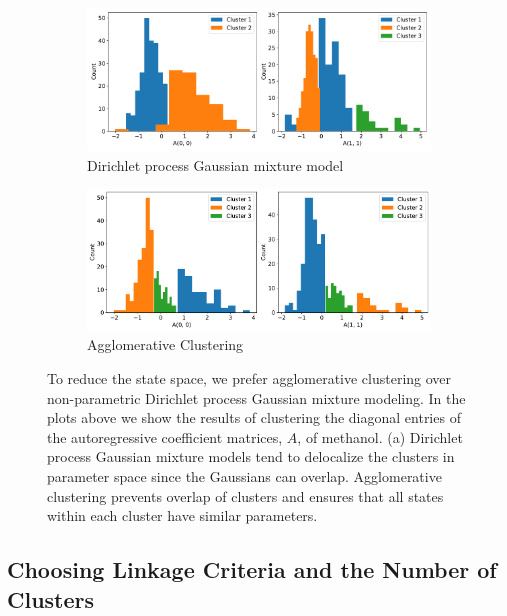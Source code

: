 \documentclass{article}
\begin{document}
  \begin{figure}[h]
  \centering
  \begin{subfigure}{0.95\textwidth}
  \includegraphics[width=\textwidth]{bayesian_A.pdf}
  \caption{Dirichlet process Gaussian mixture model}\label{fig:bayesian_A}
  \end{subfigure}
  \begin{subfigure}{0.95\textwidth}
  \includegraphics[width=\textwidth]{agglomerative_A.pdf}
  \caption{Agglomerative Clustering}\label{fig:agglomerative_A}
  \end{subfigure}
  \caption{To reduce the state space, we prefer agglomerative clustering over non-parametric
  Dirichlet process Gaussian mixture modeling. In the plots above we show the results of clustering the
  diagonal entries of the autoregressive coefficient matrices, $A$, of methanol. (a) 
  Dirichlet process Gaussian mixture models tend to delocalize the clusters in parameter space
  since the Gaussians can overlap. Agglomerative clustering prevents overlap of 
  clusters and ensures that all states within each cluster have similar parameters.
  }\label{fig:clustering_choice}
  \end{figure}
  
  \newpage
  
  \subsection{Choosing Linkage Criteria and the Number of Clusters}\label{section:nclusters}
  
\end{document}
